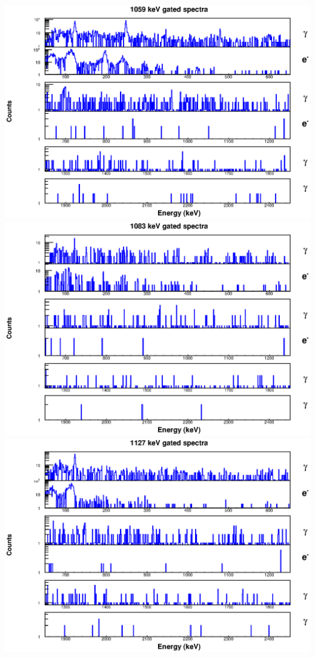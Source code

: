 \begin{landscape}
\includegraphics[scale=1.1]{154Gd_Appendix/1059_combined.eps}
\includegraphics[scale=1.1]{154Gd_Appendix/1083_combined.eps}
\includegraphics[scale=1.1]{154Gd_Appendix/1127_combined.eps}

\end{landscape}
